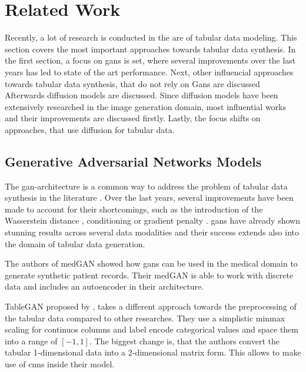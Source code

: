 \chapter{Related Work}
\label{ch:relatedWork}

Recently, a lot of research is conducted in the are of tabular data modeling.
This section covers the most important approaches towards tabular data synthesis.
In the first section, a focus on \glspl{gan} is set, where several improvements over the last years has led to state of the art performance.
Next, other influencial approaches towards tabular data synthesis, that do not rely on Gans are discussed
Afterwards diffusion models are discussed.
Since diffusion models have been extensively researched in the image generation domain, most influential works and their improvements are discussed firstly.
Lastly, the focus shifts on approaches, that use diffusion for tabular data.



\section{Generative Adversarial Networks Models}
\label{ch:relatedWork-generativeAdversarialNetworksModels}

The \gls{gan}-architecture is a common way to address the problem of tabular data synthesis in the literature \cite{borisov2022DeepNeuralNetworks}.
Over the last years, several improvements have been made to account for their shortcomings, such as the introduction of the Wasserstein\cite{frogner2015LearningWassersteinLoss}  distance \cite{arjovsky2017WassersteinGenerativeAdversarial}, conditioning \cite{mirza2014ConditionalGenerativeAdversarial} or gradient penalty \cite{gulrajani2017ImprovedTrainingWasserstein}.
\Glspl{gan} have already shown stunning results across several data modalities \cite{mckeever2020SynthesisingTabularDatasets} and their success extends also into the
domain of tabular data generation.

The authors of medGAN \cite{choi2017GeneratingMultilabelDiscrete} showed how \glspl{gan} can be used in the medical domain to generate synthetic patient records.
Their medGAN is able to work with discrete data and includes an autoencoder in their architecture.

TableGAN proposed by \cite{park2018DataSynthesisBased}, takes a different approach towards the preprocessing of the tabular data compared to other researches.
They use a simplistic minmax scaling for continuos columns and label encode categorical values and space them into a range of $[-1, 1]$.
The biggest change is, that the authors convert the tabular 1-dimensional data into a 2-dimensional matrix form.
This allows to make use of \glspl{cnn} inside their model.

